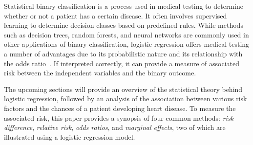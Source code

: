 Statistical binary classification is a process used in medical testing to determine whether or not a patient has a certain disease.
It often involves supervised learning to determine decision classes based on predefined rules.
While methods such as decision trees, random forests, and neural networks are commonly used in other applications of binary classification, logistic regression offers medical testing a number of advantages due to its probabilistic nature and its relationship with the odds ratio~\citep{Schober2021-vs}. 
If interpreted correctly, it can provide a measure of associated risk between the independent variables and the binary outcome.

The upcoming sections will provide an overview of the statistical theory behind logistic regression, followed by an analysis of the association between various risk factors and the chances of a patient developing heart disease.
To measure the associated risk, this paper provides a synopsis of four common methods: \emph{risk difference}, \emph{relative risk}, \emph{odds ratios}, and \emph{marginal effects}, two of which are illustrated using a logistic regression model.